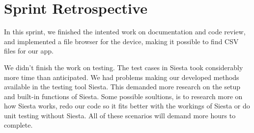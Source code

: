 \section{Sprint Retrospective} %
\label{sec:Sprint Retrospective}

In this sprint, we finished the intented work on documentation and code review, and implemented a file browser for the device, making it possible to find CSV files for our app. 

We didn't finish the work on testing. The test cases in Siesta took considerably more time than anticipated. We had problems making our developed methods available in the testing tool Siesta. 
This demanded more research on the setup and built-in functions of Siesta. Some possible soultions, is to research more on how Siesta works, redo our code so it 
fits better with the workings of Siesta or do unit testing without Siesta. All of these scenarios will demand more hours to complete.

